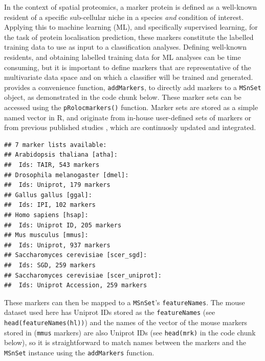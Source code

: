 In the context of spatial proteomics, a marker protein is defined as a
well-known resident of a specific sub-cellular niche in a species
\textit{and} condition of interest. Applying this to machine learning
(ML), and specifically supervised learning, for the task of protein
localisation prediction, these markers constitute the labelled
training data to use as input to a classification analyses. Defining
well-known residents, and obtaining labelled training data for ML
analyses can be time consuming, but it is important to define markers
that are representative of the multivariate data space and on which a
classifier will be trained and generated.  provides a
convenience function, \texttt{addMarkers}, to directly add markers to
a \texttt{MSnSet} object, as demonstrated in the code chunk
below. These marker sets can be accessed using the
\texttt{pRolocmarkers()} function. Marker sets are stored as a simple
named vector in R, and originate from in-house user-defined sets of
markers or from previous published studies \cite{Gatto:2014b}, which
are continuosly updated and integrated.

\begin{knitrout}
\color{fgcolor}\begin{kframe}
\begin{alltt}
\hlstd{()}
\end{alltt}
\begin{verbatim}
## 7 marker lists available:
## Arabidopsis thaliana [atha]:
##  Ids: TAIR, 543 markers
## Drosophila melanogaster [dmel]:
##  Ids: Uniprot, 179 markers
## Gallus gallus [ggal]:
##  Ids: IPI, 102 markers
## Homo sapiens [hsap]:
##  Ids: Uniprot ID, 205 markers
## Mus musculus [mmus]:
##  Ids: Uniprot, 937 markers
## Saccharomyces cerevisiae [scer_sgd]:
##  Ids: SGD, 259 markers
## Saccharomyces cerevisiae [scer_uniprot]:
##  Ids: Uniprot Accession, 259 markers
\end{verbatim}
\end{kframe}
\end{knitrout}

These markers can then be mapped to a \texttt{MSnSet}'s
\texttt{featureNames}. The mouse dataset used here has Uniprot IDs
stored as the \texttt{featureNames} (see
\texttt{head(featureNames(hl))}) and the names of the vector of the
mouse markers stored in  (\texttt{mmus} markers) are
also Uniprot IDs (see \texttt{head(mrk)} in the code chunk below), so
it is straightforward to match names between the markers and the
\texttt{MSnSet} instance using the \texttt{addMarkers} function. 

